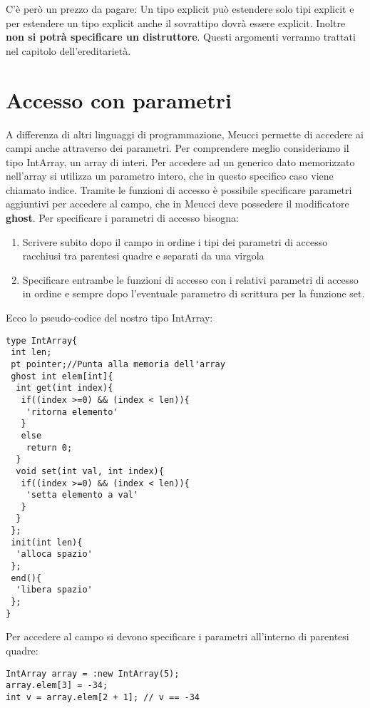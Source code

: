 \documentclass[10pt]{book}%
\newcommand{\e}{\`{e} }
\newcommand{\ac}[1]{\`{#1}}
\renewcommand{\emph}[1]{\textbf{#1}}
\newenvironment{codeenv}{
\begin{mdframed}[backgroundcolor=black!20,topline=false,leftline=false,rightline=false,bottomline=false]
}
{\end{mdframed}}
\begin{document}
C'\e per\ac o un prezzo da pagare: Un tipo explicit pu\ac o estendere solo tipi explicit e per estendere un tipo explicit anche il sovrattipo dovr\ac a essere explicit. Inoltre \emph{non si potr\ac a specificare un distruttore}. Questi argomenti verranno trattati nel capitolo dell'ereditariet\ac a.

\section{Accesso con parametri}
A differenza di altri linguaggi di programmazione, Meucci permette di accedere ai campi anche attraverso dei parametri. Per comprendere meglio consideriamo il tipo IntArray, un array di interi. Per accedere ad un generico dato memorizzato nell'array si utilizza un parametro intero, che in questo specifico caso viene chiamato indice. Tramite le funzioni di accesso \e possibile specificare parametri aggiuntivi per accedere al campo, che in Meucci deve possedere il modificatore \emph{ghost}. Per specificare i parametri di accesso bisogna:
\begin{enumerate}
\item Scrivere subito dopo il campo in ordine i tipi dei parametri di accesso racchiusi tra parentesi quadre e separati da una virgola
\item Specificare entrambe le funzioni di accesso con i relativi parametri di accesso in ordine e sempre dopo l'eventuale parametro di scrittura per la funzione set.
\end{enumerate}

Ecco lo pseudo-codice del nostro tipo IntArray:
\begin{codeenv}
\begin{verbatim}
type IntArray{
 int len;
 pt pointer;//Punta alla memoria dell'array
 ghost int elem[int]{
  int get(int index){
   if((index >=0) && (index < len)){
    'ritorna elemento'
   }
   else
    return 0;
  }
  void set(int val, int index){
   if((index >=0) && (index < len)){
    'setta elemento a val'
   }
  }
 };
 init(int len){
  'alloca spazio'
 };
 end(){
  'libera spazio'
 };
}
\end{verbatim}
\end{codeenv}
Per accedere al campo si devono specificare i parametri all'interno di parentesi quadre:
\begin{codeenv}
\begin{verbatim}
IntArray array = :new IntArray(5);
array.elem[3] = -34;
int v = array.elem[2 + 1]; // v == -34
\end{verbatim}
\end{codeenv}
\end{document}
